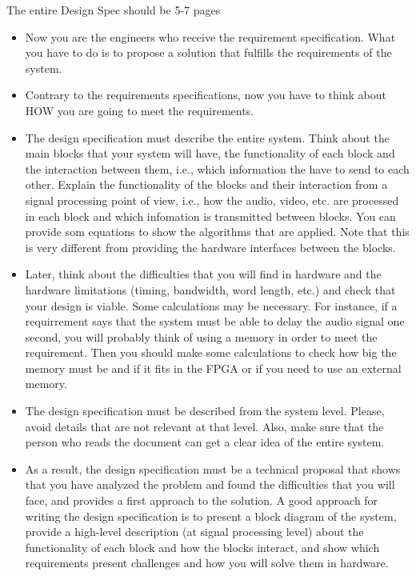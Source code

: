 The entire Design Spec should be 5-7 pages

\begin{itemize}
\item Now you are the engineers who receive the requirement specification. What you have to do is to propose a solution that fulfills the requirements of the system.
\item Contrary to the requirements specifications, now you have to think about HOW you are going to meet  the requirements.
\item The design specification must describe the entire system. Think about the main blocks that your system will have, the functionality of each block and the interaction between them, i.e., which information the have to send to each other. Explain the functionality of the blocks and their interaction from a signal processing point of view, i.e., how the audio, video, etc. are processed in each block and which infomation is transmitted between blocks. You can provide som equations to show the algorithms that are applied. Note that this is very different from providing the hardware interfaces between the blocks.
\item Later, think about the difficulties that you will find in hardware and the hardware limitations (timing, bandwidth, word length, etc.) and check that your design is viable. Some calculations may be necessary. For instance, if a requirrement says that the system must be able to delay the audio signal one second, you will probably think of using a memory in order to meet the requirement. Then you should make some calculations to check how big the memory must be and if it fits in the FPGA or if you need to use an external memory.
\item The design specification must be described from the system level. Please, avoid details that are not relevant at that level. Also, make sure that the person who reads the document can get a clear idea of the entire system.
\item As a result, the design specification must be a technical proposal that shows that you have analyzed the problem and found the difficulties that you will face, and provides a first approach to the solution. A good approach for writing the design specification is to present a block diagram of the system, provide a high-level description (at signal processing level) about the functionality of each block and how the blocks interact, and show which requirements present challenges and how you will solve them in hardware.
\end{itemize}

